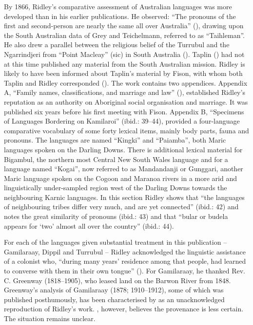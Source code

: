 By 1866, Ridley’s comparative assessment of Australian languages was more developed than in his earlier publications. He observed: “The pronouns of the first and second-person are nearly the same all over Australia” (\citeyear[43]{ridley_kamilaroi_1866}), drawing upon the South Australian data of Grey and Teichelmann, referred to as ``Taihleman''. He also drew a parallel between the religious belief of the Turrubul and the Ngarrindjeri from “Point Macleay” (sic) in South Australia (\citeyear[65]{ridley_kamilaroi_1866}). Taplin () had not at this time published any material from the South Australian mission. Ridley is likely to have been informed about Taplin’s material by Fison, with whom both Taplin and Ridley corresponded (\citealt[4--7, 9--12]{elkin_r_1975}). The work contains two appendices. Appendix A, “Family names, classifications, and marriage and law” (\citeyear[35--38]{ridley_kamilaroi_1866}), established Ridley’s reputation as an authority on Aboriginal social organisation and marriage. It was published six years before his first meeting with Fison. Appendix B, “Specimens of Languages Bordering on Kamilaroi” (ibid.: 39--44), provided a four-language comparative vocabulary of some forty lexical items, mainly body parts, fauna and pronouns. The languages are named “Kingki” and ``Paiamba'', both Maric languages spoken on the Darling Downs. There is additional lexical material for Bigambul, the northern most Central New South Wales language and for a language named ``Kogai'', now referred to as Mandandanji or Gunggari, another Maric language spoken on the Cogoon and Maranoa rivers in a more arid and linguistically under-sampled region \citep[825]{bowern_computational_2012} west of the Darling Downs towards the neighbouring Karnic languages. In this section Ridley shows that “the languages of neighbouring tribes differ very much, and are yet connected” (ibid.: 42) and notes the great similarity of pronouns (ibid.: 43) and that “bular or budela appears for `two' almost all over the country” (ibid.: 44).

For each of the languages given substantial treatment in this publication – Gamilaraay, Dippil and Turrubul – Ridley acknowledged the linguistic assistance of a colonist who, “during many years' residence among that people, had learned to converse with them in their own tongue” (\citeyear[v]{ridley_kamilaroi_1866}). For Gamilaraay, he thanked Rev. C. Greenway (1818--1905), who leased land on the Barwon River from 1848. Greenway’s analysis of Gamilaraay (1878; 1910--1912), some of which was published posthumously, has been characterised by \citet[41]{austin_gamilaraay_2008} as an unacknowledged reproduction of Ridley’s work. \citet[5]{Giacon2014}, however, believes the provenance is less certain. The situation remains unclear.


